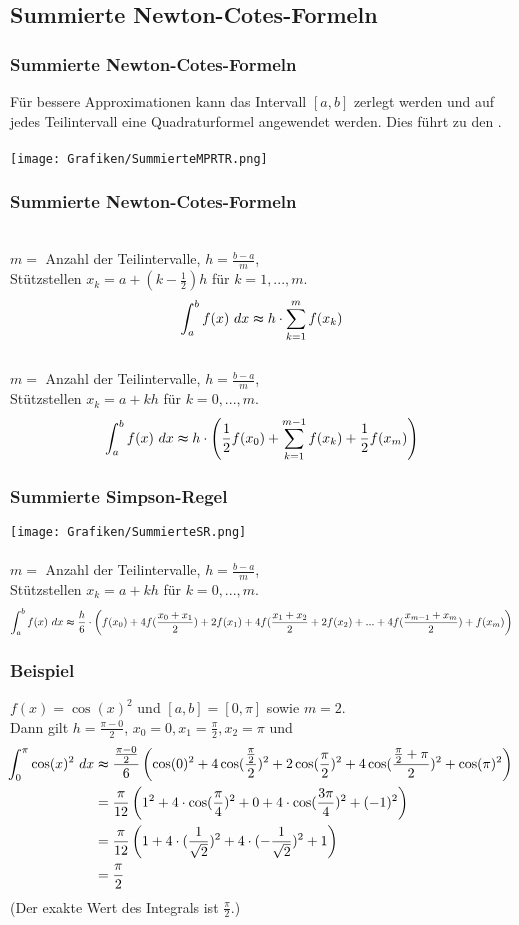 \subsection{Summierte Newton-Cotes-Formeln}
%
\begin{frame}\frametitle{Summierte Newton-Cotes-Formeln}
Für bessere Approximationen kann das Intervall $[a,b]$ zerlegt werden und auf jedes Teilintervall eine Quadraturformel angewendet werden. Dies führt zu den .\\\quad\\
\texttt{[image: Grafiken/SummierteMPRTR.png]}\\
\end{frame}
%
\begin{frame}\frametitle{Summierte Newton-Cotes-Formeln}
\\
$m=$ Anzahl der Teilintervalle, $h=\frac{b-a}{m}$, \\Stützstellen $x_k=a+(k-\frac{1}{2})h$ für $k=1,...,m$.
$$
\int_a^b f(x) \ dx \thickapprox h \cdot \sum_{k=1}^m f(x_k)
$$\pause
{}\\
$m=$ Anzahl der Teilintervalle, $h=\frac{b-a}{m}$, \\Stützstellen $x_k=a+kh$ für $k=0,...,m$.
$$
\int_a^b f(x) \ dx \thickapprox h \cdot \left(\frac{1}{2}f(x_0)+ \sum_{k=1}^{m-1} f(x_k) + \frac{1}{2}f(x_m)\right)
$$

\end{frame}
%
\begin{frame}\frametitle{Summierte Simpson-Regel}
\texttt{[image: Grafiken/SummierteSR.png]}\\
\\
$m=$ Anzahl der Teilintervalle, $h=\frac{b-a}{m}$, \\Stützstellen $x_k=a+kh$ für $k=0,...,m$.
\tiny
$$
\int_a^b f(x) \ dx \thickapprox \frac{h}{6} \cdot \left(f(x_0)+ 4f(\frac{x_0+x_1}{2})+2f(x_1)+4f(\frac{x_1+x_2}{2}+2f(x_2)+...+4f(\frac{x_{m-1}+x_m}{2})+f(x_m)\right)
$$
\end{frame}
%
\begin{frame}\frametitle{Beispiel}
$f(x)=\cos(x)^2$ und $[a,b]=[0, \pi]$ sowie $m=2$. \\\pause 
Dann gilt $h=\frac{\pi-0}{2}$, $x_0=0, x_1=\frac{\pi}{2}, x_2=\pi$ und \pause
\footnotesize
\hspace{-1mm}
\begin{align*}
\hspace{-1mm}\int_0^\pi \cos(x)^2\ dx &\thickapprox \frac{\frac{\pi - 0}{2}}{6}\left(\cos(0)^2+4\cos(\frac{\frac{\pi}{2}}{2})^2+2\cos(\frac{\pi}{2})^2+4\cos(\frac{\frac{\pi}{2}+\pi}{2})^2+\cos(\pi)^2 \right)\\
&=\frac{\pi}{12}\left(1^2+4\cdot \cos(\frac{\pi}{4})^2+0+4\cdot \cos(\frac{3\pi}{4})^2+(-1)^2\right)\\
&=\frac{\pi}{12}\left(1+4\cdot (\frac{1}{\sqrt{2}})^2+4\cdot(-\frac{1}{\sqrt{2}})^2+1\right)\\
&=\frac{\pi}{2}
\end{align*}
\vfill
\normalsize
(Der exakte Wert des Integrals ist $\frac{\pi}{2}$.)
\end{frame}
